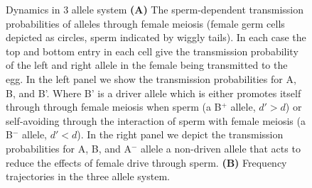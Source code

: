 \documentclass[12pt,letterpaper]{article}
\begin{document}
\begin{figure}
\caption{Dynamics in 3 allele system
{\bf (A) } The sperm-dependent transmission probabilities of alleles through
female meiosis (female germ cells depicted as circles, sperm indicated by wiggly
tails). In each case the top and bottom entry in each cell give the
transmission probability of the left and right allele in the female
being transmitted to the egg. In the left panel we show the transmission probabilities for
  A, B, and B'. Where B' is a driver allele which is either promotes
  itself through through female meiosis when sperm (a B$^+$ allele,
  $d'>d$) or self-avoiding through the interaction of sperm with female meiosis (a B$^-$ allele,
$d'<d$). In the right panel we depict the transmission probabilities for
  A, B, and A$^-$ allele a non-driven allele that acts to reduce the
  effects of female drive through sperm.
{\bf (B)} Frequency trajectories in the three allele system. }
 \label{Eggsperm_3_allele_cartoon}
\end{figure}


\end{document}
